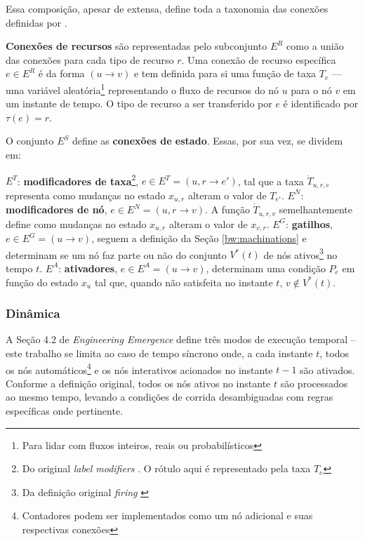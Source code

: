 \documentclass[10pt,a4paper]{article}
\newcommand{\note}[1]{
    \vspace{0.3cm}
    \colorbox{blue!30}{
            \begin{minipage}{0.4\textwidth}
		    \ttfamily \footnotesize
               #1
            \end{minipage}
        }
    \vspace{0.3cm}
}
\begin{document}
Essa composição, apesar de extensa, define toda a taxonomia das conexões definidas por \citeauthor{machinations}.

\textbf{Conexões de recursos} são representadas pelo subconjunto $E^R$ como a união das conexões para cada tipo de recurso $r$. Uma conexão de recurso específica $e \in E^R$ é da forma $(u \rightarrow v)$ e tem definida para si uma função de taxa $T_e$ --- uma variável aleatória\footnote{Para lidar com fluxos inteiros, reais ou probabilísticos} representando o fluxo de recursos do nó $u$ para o nó $v$ em um instante de tempo. O tipo de recurso a ser transferido por $e$ é identificado por $\tau (e) = r$.

O conjunto $E^S$ define as \textbf{conexões de estado}. Essas, por sua vez, se dividem em:

\begin{outline}
    \1 $E^T$: \textbf{modificadores de taxa}\footnote{Do original \textit{label modifiers} \parencite{machinations}. O rótulo aqui é representado pela taxa $T_e$}, $e \in E^T = (u, r\rightarrow e')$, tal que a taxa $\dot{T}_{u,r,e}$ representa como mudanças no estado $x_{u, r}$ alteram o valor de $T_{e'}$.
    \1 $E^N$: \textbf{modificadores de nó}, $e \in E^N = (u, r \rightarrow v)$. A função $\dot{T}_{u,r,v}$ semelhantemente define como mudanças no estado $x_{u, r}$ alteram o valor de $x_{v, r}$.
    \1 $E^G$: \textbf{gatilhos}, $e \in E^G = (u \rightarrow v)$, seguem a definição da Seção \ref{bw:machinations} e determinam se um nó faz parte ou não do conjunto $V^*(t)$ de nós ativos\footnote{Da definição original \textit{firing} \parencite{machinations}} no tempo $t$. 
    \1 $E^A$: \textbf{ativadores}, $e \in E^A = (u \rightarrow v)$, determinam uma condição $P_e$ em função do estado $x_{u}$ tal que, quando não satisfeita no instante $t$, $v \notin V^*(t)$.
\end{outline}

\subsubsection{Dinâmica}
\label{m:modeling:dynamics}
A Seção 4.2 de \textit{Engineering Emergence} define três modos de execução temporal -- este trabalho se limita ao caso de tempo síncrono onde, a cada instante $t$, todos os nós automáticos\footnote{Contadores podem ser implementados como um nó adicional e suas respectivas conexões} e os nós interativos acionados no instante $t-1$ são ativados. Conforme a definição original, todos os nós ativos no instante $t$ são processados ao mesmo tempo, levando a condições de corrida desambiguadas com regras específicas onde pertinente.
\end{document}
